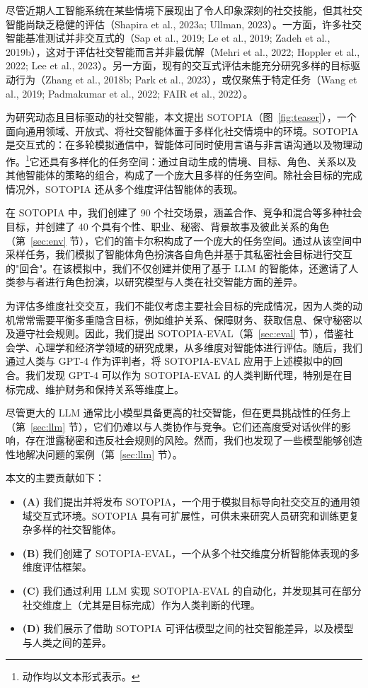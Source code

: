 \documentclass[11pt,a4paper]{article}
\begin{document}
尽管近期人工智能系统在某些情境下展现出了令人印象深刻的社交技能，但其社交智能尚缺乏稳健的评估（Shapira et al., 2023a; Ullman, 2023）。一方面，许多社交智能基准测试并非交互式的（Sap et al., 2019; Le et al., 2019; Zadeh et al., 2019b），这对于评估社交智能而言并非最优解（Mehri et al., 2022; Hoppler et al., 2022; Lee et al., 2023）。另一方面，现有的交互式评估未能充分研究多样的目标驱动行为（Zhang et al., 2018b; Park et al., 2023），或仅聚焦于特定任务（Wang et al., 2019; Padmakumar et al., 2022; FAIR et al., 2022）。

为研究动态且目标驱动的社交智能，本文提出 SOTOPIA（图~\ref{fig:teaser}），一个面向通用领域、开放式、将社交智能体置于多样化社交情境中的环境。SOTOPIA 是交互式的：在多轮模拟通信中，智能体可同时使用言语与非言语沟通以及物理动作。\footnote{动作均以文本形式表示。}它还具有多样化的任务空间：通过自动生成的情境、目标、角色、关系以及其他智能体的策略的组合，构成了一个庞大且多样的任务空间。除社会目标的完成情况外，SOTOPIA 还从多个维度评估智能体的表现。

在 SOTOPIA 中，我们创建了 90 个社交场景，涵盖合作、竞争和混合等多种社会目标，并创建了 40 个具有个性、职业、秘密、背景故事及彼此关系的角色（第~\ref{sec:env} 节），它们的笛卡尔积构成了一个庞大的任务空间。通过从该空间中采样任务，我们模拟了智能体角色扮演各自角色并基于其私密社会目标进行交互的"回合"。在该模拟中，我们不仅创建并使用了基于 LLM 的智能体，还邀请了人类参与者进行角色扮演，以研究模型与人类在社交智能方面的差异。

为评估多维度社交交互，我们不能仅考虑主要社会目标的完成情况，因为人类的动机常常需要平衡多重隐含目标，例如维护关系、保障财务、获取信息、保守秘密以及遵守社会规则。因此，我们提出 SOTOPIA-EVAL（第~\ref{sec:eval} 节），借鉴社会学、心理学和经济学领域的研究成果，从多维度对智能体进行评估。随后，我们通过人类与 GPT-4 作为评判者，将 SOTOPIA-EVAL 应用于上述模拟中的回合。我们发现 GPT-4 可以作为 SOTOPIA-EVAL 的人类判断代理，特别是在目标完成、维护财务和保持关系等维度上。

尽管更大的 LLM 通常比小模型具备更高的社交智能，但在更具挑战性的任务上（第~\ref{sec:llm} 节），它们仍难以与人类协作与竞争。它们还高度受对话伙伴的影响，存在泄露秘密和违反社会规则的风险。然而，我们也发现了一些模型能够创造性地解决问题的案例（第~\ref{sec:llm} 节）。

本文的主要贡献如下：
\begin{itemize}
    \item \textbf{(A)} 我们提出并将发布 SOTOPIA，一个用于模拟目标导向社交交互的通用领域交互式环境。SOTOPIA 具有可扩展性，可供未来研究人员研究和训练更复杂多样的社交智能体。
    \item \textbf{(B)} 我们创建了 SOTOPIA-EVAL，一个从多个社交维度分析智能体表现的多维度评估框架。
    \item \textbf{(C)} 我们通过利用 LLM 实现 SOTOPIA-EVAL 的自动化，并发现其可在部分社交维度上（尤其是目标完成）作为人类判断的代理。
    \item \textbf{(D)} 我们展示了借助 SOTOPIA 可评估模型之间的社交智能差异，以及模型与人类之间的差异。
\end{itemize}
\end{document}
